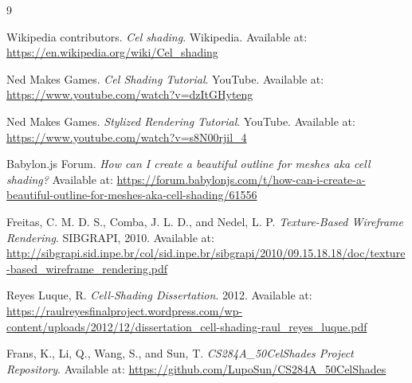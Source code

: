 \documentclass[acmtog,screen]{acmart}
\begin{document}
\begin{thebibliography}{9}

Wikipedia contributors.
\textit{Cel shading}.
Wikipedia.
Available at: \url{https://en.wikipedia.org/wiki/Cel_shading}

Ned Makes Games.
\textit{Cel Shading Tutorial}.
YouTube.
Available at: \url{https://www.youtube.com/watch?v=dzItGHyteng}

Ned Makes Games.
\textit{Stylized Rendering Tutorial}.
YouTube.
Available at: \url{https://www.youtube.com/watch?v=s8N00rjil_4}

Babylon.js Forum.
\textit{How can I create a beautiful outline for meshes aka cell shading?}
Available at: \url{https://forum.babylonjs.com/t/how-can-i-create-a-beautiful-outline-for-meshes-aka-cell-shading/61556}

Freitas, C. M. D. S., Comba, J. L. D., and Nedel, L. P.
\textit{Texture-Based Wireframe Rendering}.
SIBGRAPI, 2010.
Available at: \url{http://sibgrapi.sid.inpe.br/col/sid.inpe.br/sibgrapi/2010/09.15.18.18/doc/texture-based_wireframe_rendering.pdf}

Reyes Luque, R.
\textit{Cell-Shading Dissertation}.
2012.
Available at: \url{https://raulreyesfinalproject.wordpress.com/wp-content/uploads/2012/12/dissertation_cell-shading-raul_reyes_luque.pdf}

Frans, K., Li, Q., Wang, S., and Sun, T.
\textit{CS284A\_50CelShades Project Repository}.
Available at: \url{https://github.com/LupoSun/CS284A_50CelShades}

\end{thebibliography}
\end{document}
